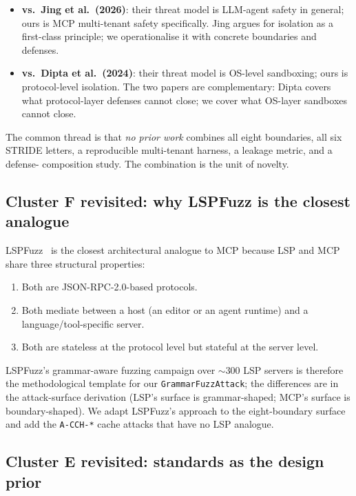 \begin{itemize}
        change; we study leakage under concurrency.
  \item \textbf{vs.\ Jing et al.~(2026)}: their threat model
        is LLM-agent safety in general; ours is MCP
        multi-tenant safety specifically. Jing argues for
        isolation as a first-class principle; we
        operationalise it with concrete boundaries and
        defenses.
  \item \textbf{vs.\ Dipta et al.~(2024)}: their threat model
        is OS-level sandboxing; ours is protocol-level
        isolation. The two papers are complementary: Dipta
        covers what protocol-layer defenses cannot close;
        we cover what OS-layer sandboxes cannot close.
\end{itemize}

The common thread is that \emph{no prior work} combines all
eight boundaries, all six STRIDE letters, a reproducible
multi-tenant harness, a leakage metric, and a defense-
composition study. The combination is the unit of novelty.

\subsection{Cluster F revisited: why LSPFuzz is the closest analogue}

LSPFuzz~\cite{zhu_2025_lspfuzz} is the closest architectural
analogue to MCP because LSP and MCP share three structural
properties:

\begin{enumerate}
  \item Both are JSON-RPC-2.0-based protocols.
  \item Both mediate between a host (an editor or an agent
        runtime) and a language/tool-specific server.
  \item Both are stateless at the protocol level but stateful
        at the server level.
\end{enumerate}

LSPFuzz's grammar-aware fuzzing campaign over $\sim$300 LSP
servers is therefore the methodological template for our
\texttt{GrammarFuzzAttack}; the differences are in the
attack-surface derivation (LSP's surface is grammar-shaped;
MCP's surface is boundary-shaped). We adapt LSPFuzz's
approach to the eight-boundary surface and add the
\texttt{A-CCH-*} cache attacks that have no LSP analogue.

\subsection{Cluster E revisited: standards as the design prior}

